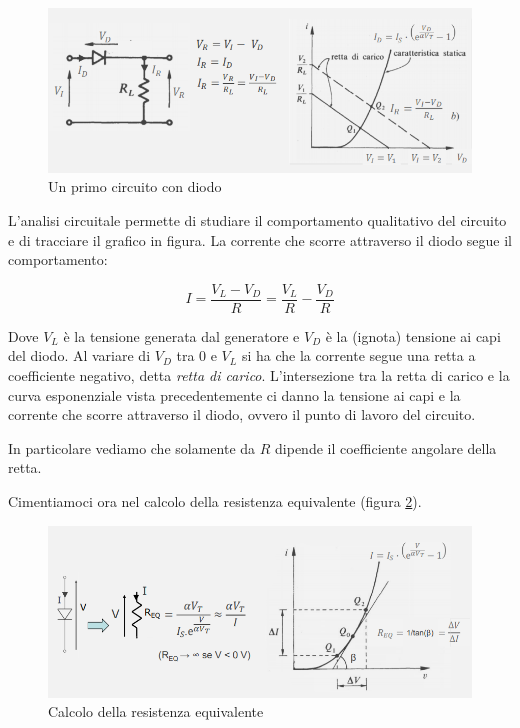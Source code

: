 \documentclass{article}
\begin{document}
\begin{figure}[h]
  \centering
  \includegraphics[scale=0.7]{IM_analisi_diodo}
  \caption{Un primo circuito con diodo}
  \label{Schema_analisi_diodo}
\end{figure}

L'analisi circuitale permette di studiare il comportamento qualitativo del circuito e di tracciare il grafico in figura. La corrente che scorre attraverso il diodo segue il comportamento:

\[I = \frac {V_L - V_D}{R} = \frac {V_L}{R} - \frac {V_D}{R}\]

Dove $V_L$ è la tensione generata dal generatore e $V_D$ è la (ignota) tensione ai capi del diodo. Al variare di $V_D$ tra $0$ e $V_L$ si ha che la corrente segue una retta a coefficiente negativo, detta \textit{retta di carico}. L'intersezione tra la retta di carico e la curva esponenziale vista precedentemente ci danno la tensione ai capi e la corrente che scorre attraverso il diodo, ovvero il punto di lavoro del circuito.

In particolare vediamo che solamente da $R$ dipende il coefficiente angolare della retta.

\vspace{3mm}

Cimentiamoci ora nel calcolo della resistenza equivalente (figura \ref{Schema_diodo_resistenza_equivalente}).

\begin{figure}[h]
  \centering
  \includegraphics[scale=0.6]{IM_diodo_resistenza_equivalente}
  \caption{Calcolo della resistenza equivalente}
  \label{Schema_diodo_resistenza_equivalente}
\end{figure}
\end{document}
